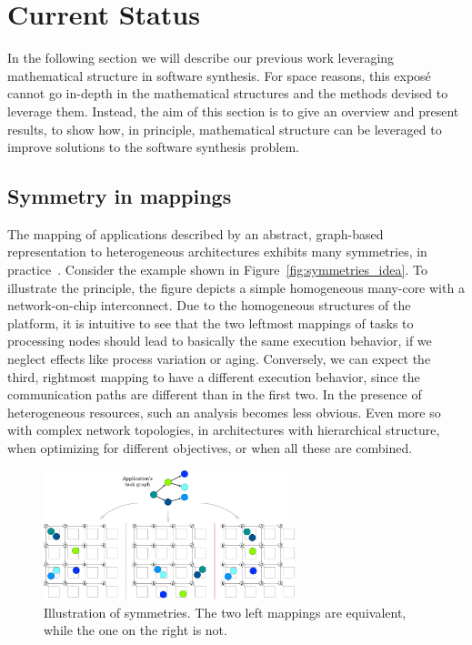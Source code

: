 \documentclass{article}
\begin{document}
\section{Current Status}

In the following section we will describe our previous work leveraging mathematical structure in software synthesis. For space reasons, this exposé cannot go in-depth in the mathematical structures and the methods devised to leverage them.
Instead, the aim of this section is to give an overview and present results, to show how, in principle, mathematical structure can be leveraged to improve solutions to the software synthesis problem.

\subsection{Symmetry in mappings}

The mapping of applications described by an abstract, graph-based representation to heterogeneous architectures exhibits many symmetries, in practice~\cite{goens_iess,goens_taco}. Consider the example shown in Figure~\ref{fig:symmetries_idea}.
To illustrate the principle, the figure depicts a simple homogeneous many-core with a network-on-chip interconnect. Due to the homogeneous structures of the platform, it is intuitive to see that the two leftmost mappings of tasks to processing nodes should lead to basically the same execution behavior, 
if we neglect effects like process variation or aging.
Conversely, we can expect the third, rightmost mapping to have a different execution behavior, since the communication paths are different than in the first two. 
In the presence of heterogeneous resources, such an analysis becomes less obvious.
Even more so with complex network topologies, in architectures with hierarchical structure, when optimizing for different objectives, or when all these are combined.
\begin{figure}[h]
	\centering
	\includegraphics[width=0.65\textwidth]{figures/SymmetriesIntro.pdf}
	\caption{Illustration of symmetries. The two left mappings are equivalent, while the one on the right is not.}
	\label{fig:symmintro}
\end{figure}
\end{document}

